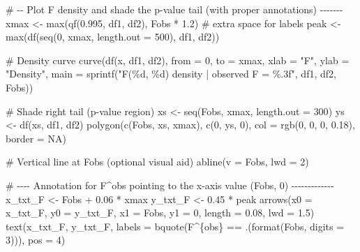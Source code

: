 \documentclass[
  letterpaper,
]{scrbook}
\newenvironment{Shaded}{\begin{snugshade}}{\end{snugshade}}
\newcommand{\AttributeTok}[1]{\textcolor[rgb]{0.40,0.45,0.13}{#1}}
\newcommand{\CommentTok}[1]{\textcolor[rgb]{0.37,0.37,0.37}{#1}}
\newcommand{\ConstantTok}[1]{\textcolor[rgb]{0.56,0.35,0.01}{#1}}
\newcommand{\DecValTok}[1]{\textcolor[rgb]{0.68,0.00,0.00}{#1}}
\newcommand{\FloatTok}[1]{\textcolor[rgb]{0.68,0.00,0.00}{#1}}
\newcommand{\FunctionTok}[1]{\textcolor[rgb]{0.28,0.35,0.67}{#1}}
\newcommand{\NormalTok}[1]{\textcolor[rgb]{0.00,0.23,0.31}{#1}}
\newcommand{\OtherTok}[1]{\textcolor[rgb]{0.00,0.23,0.31}{#1}}
\newcommand{\SpecialCharTok}[1]{\textcolor[rgb]{0.37,0.37,0.37}{#1}}
\newcommand{\StringTok}[1]{\textcolor[rgb]{0.13,0.47,0.30}{#1}}
\begin{document}
\begin{Shaded}
\begin{Highlighting}[]
\CommentTok{\# {-}{-} Plot F density and shade the p{-}value tail (with proper annotations) {-}{-}{-}{-}{-}{-}{-}}
\NormalTok{xmax }\OtherTok{\textless{}{-}} \FunctionTok{max}\NormalTok{(}\FunctionTok{qf}\NormalTok{(}\FloatTok{0.995}\NormalTok{, df1, df2), Fobs }\SpecialCharTok{*} \FloatTok{1.2}\NormalTok{)  }\CommentTok{\# extra space for labels}
\NormalTok{peak }\OtherTok{\textless{}{-}} \FunctionTok{max}\NormalTok{(}\FunctionTok{df}\NormalTok{(}\FunctionTok{seq}\NormalTok{(}\DecValTok{0}\NormalTok{, xmax, }\AttributeTok{length.out =} \DecValTok{500}\NormalTok{), df1, df2))}

\CommentTok{\# Density curve}
\FunctionTok{curve}\NormalTok{(}\FunctionTok{df}\NormalTok{(x, df1, df2), }\AttributeTok{from =} \DecValTok{0}\NormalTok{, }\AttributeTok{to =}\NormalTok{ xmax,}
      \AttributeTok{xlab =} \StringTok{"F"}\NormalTok{, }\AttributeTok{ylab =} \StringTok{"Density"}\NormalTok{,}
      \AttributeTok{main =} \FunctionTok{sprintf}\NormalTok{(}\StringTok{"F(\%d, \%d) density  |  observed F = \%.3f"}\NormalTok{, df1, df2, Fobs))}

\CommentTok{\# Shade right tail (p{-}value region)}
\NormalTok{xs }\OtherTok{\textless{}{-}} \FunctionTok{seq}\NormalTok{(Fobs, xmax, }\AttributeTok{length.out =} \DecValTok{300}\NormalTok{)}
\NormalTok{ys }\OtherTok{\textless{}{-}} \FunctionTok{df}\NormalTok{(xs, df1, df2)}
\FunctionTok{polygon}\NormalTok{(}\FunctionTok{c}\NormalTok{(Fobs, xs, xmax), }\FunctionTok{c}\NormalTok{(}\DecValTok{0}\NormalTok{, ys, }\DecValTok{0}\NormalTok{),}
        \AttributeTok{col =} \FunctionTok{rgb}\NormalTok{(}\DecValTok{0}\NormalTok{, }\DecValTok{0}\NormalTok{, }\DecValTok{0}\NormalTok{, }\FloatTok{0.18}\NormalTok{), }\AttributeTok{border =} \ConstantTok{NA}\NormalTok{)}

\CommentTok{\# Vertical line at Fobs (optional visual aid)}
\FunctionTok{abline}\NormalTok{(}\AttributeTok{v =}\NormalTok{ Fobs, }\AttributeTok{lwd =} \DecValTok{2}\NormalTok{)}

\CommentTok{\# {-}{-}{-}{-} Annotation for F\^{}obs pointing to the x{-}axis value (Fobs, 0) {-}{-}{-}{-}{-}{-}{-}{-}{-}{-}{-}{-}{-}}
\NormalTok{x\_txt\_F }\OtherTok{\textless{}{-}}\NormalTok{ Fobs }\SpecialCharTok{+} \FloatTok{0.06} \SpecialCharTok{*}\NormalTok{ xmax}
\NormalTok{y\_txt\_F }\OtherTok{\textless{}{-}} \FloatTok{0.45} \SpecialCharTok{*}\NormalTok{ peak}
\FunctionTok{arrows}\NormalTok{(}\AttributeTok{x0 =}\NormalTok{ x\_txt\_F, }\AttributeTok{y0 =}\NormalTok{ y\_txt\_F, }\AttributeTok{x1 =}\NormalTok{ Fobs, }\AttributeTok{y1 =} \DecValTok{0}\NormalTok{,}
       \AttributeTok{length =} \FloatTok{0.08}\NormalTok{, }\AttributeTok{lwd =} \FloatTok{1.5}\NormalTok{)}
\FunctionTok{text}\NormalTok{(x\_txt\_F, y\_txt\_F,}
     \AttributeTok{labels =} \FunctionTok{bquote}\NormalTok{(F}\SpecialCharTok{\^{}}\NormalTok{\{obs\} }\SpecialCharTok{==}\NormalTok{ .(}\FunctionTok{format}\NormalTok{(Fobs, }\AttributeTok{digits =} \DecValTok{3}\NormalTok{))),}
     \AttributeTok{pos =} \DecValTok{4}\NormalTok{)}


\end{Highlighting}
\end{Shaded}
\end{document}
